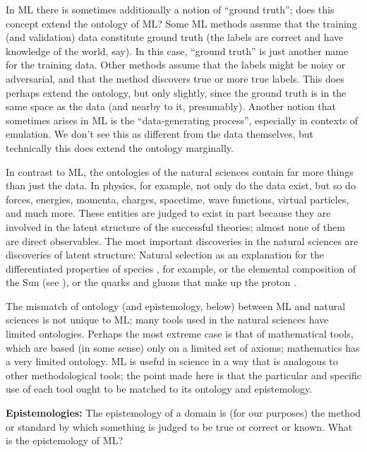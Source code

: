 \documentclass{article}
\renewcommand{\paragraph}[1]{\noindent\par\textbf{#1}}
\begin{document}
In ML there is sometimes additionally a notion of ``ground truth''; does this concept extend the ontology of ML?
Some ML methods assume that the training (and validation) data constitute ground truth (the labels are correct and have knowledge of the world, say).
In this case, ``ground truth'' is just another name for the training data.
Other methods assume that the labels might be noisy or adversarial, and that the method discovers true or more true labels.
This does perhaps extend the ontology, but only slightly, since the ground truth is in the same space as the data (and nearby to it, presumably).
Another notion that sometimes arises in ML is the ``data-generating process'', especially in contexts of emulation.
We don't see this as different from the data themselves, but technically this does extend the ontology marginally.

In contrast to ML, the ontologies of the natural sciences contain far more things than just the data.
In physics, for example, 
not only do the data exist, but so do forces, energies, momenta, charges, spacetime, wave functions, virtual particles, and much more.
These entities are judged to exist in part because they are involved in the latent structure of the successful theories; almost none of them are direct observables.
The most important discoveries in the natural sciences are discoveries of latent structure: Natural selection as an explanation for the differentiated properties of species \cite{natural_selection}, for example, or the elemental composition of the Sun (see \citealt{sun_composition}), or the quarks and gluons that make up the proton \cite{proton_substructure}.

The mismatch of ontology (and epistemology, below) between ML and natural sciences is not unique to ML;
many tools used in the natural sciences have limited ontologies.
Perhaps the most extreme case is that of mathematical tools, which are based (in some sense) only on a limited set of axioms; mathematics has a very limited ontology.
ML is useful in science in a way that is analogous to other methodological tools; the point made here is that the particular and specific use of each tool ought to be matched to its ontology and epistemology.

\paragraph{Epistemologies:}
The epistemology of a domain is (for our purposes) the method or standard by which something is judged to be true or correct or known.
What is the epistemology of ML?
\end{document}
